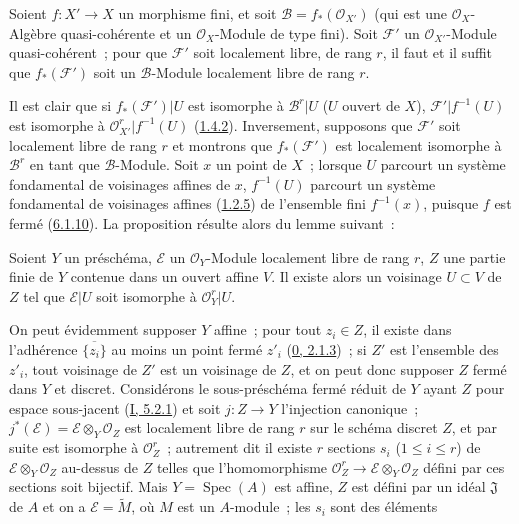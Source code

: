 \begin{proposition}[6.1.12]
\label{II.6.1.12-fr}
Soient $f:X'\to X$ un morphisme fini, et soit
$\mathcal{B}=f_*(\mathcal{O}_{X'})$ (qui est une $\mathcal{O}_X$-Algèbre
quasi-cohérente et un $\mathcal{O}_X$-Module de type fini). Soit
$\mathcal{F}'$ un $\mathcal{O}_{X'}$-Module quasi-cohérent~; pour que
$\mathcal{F}'$ soit localement libre, de rang $r$, il faut et il suffit que
$f_*(\mathcal{F}')$ soit un $\mathcal{B}$-Module localement libre de rang
$r$.
\end{proposition}

Il est clair que si $f_*(\mathcal{F}')|U$ est isomorphe à
$\mathcal{B}^r|U$ ($U$ ouvert de $X$), $\mathcal{F}'|f^{-1}(U)$ est isomorphe
à $\mathcal{O}_{X'}^r|f^{-1}(U)$
(\hyperref[II.1.4.2-fr]{1.4.2}). Inversement, supposons que $\mathcal{F}'$
soit localement libre de rang $r$ et montrons que $f_*(\mathcal{F}')$ est
localement isomorphe à $\mathcal{B}^r$ en tant que $\mathcal{B}$-Module. Soit
$x$ un point de $X$~; lorsque $U$ parcourt un système fondamental de
voisinages affines de $x$, $f^{-1}(U)$ parcourt un système fondamental de
voisinages affines (\hyperref[II.1.2.5-fr]{1.2.5}) de l'ensemble fini
$f^{-1}(x)$, puisque $f$ est fermé
(\hyperref[II.6.1.10-fr]{6.1.10}). La proposition résulte alors du lemme
suivant~:

\begin{lemma}[6.1.12.1]
\label{II.6.1.12.1-fr}
Soient $Y$ un préschéma, $\mathcal{E}$ un $\mathcal{O}_Y$-Module localement
libre de rang $r$, $Z$ une partie finie de $Y$ contenue dans un ouvert affine
$V$. Il existe alors un voisinage $U\subset V$ de $Z$ tel que
$\mathcal{E}|U$ soit isomorphe à $\mathcal{O}_Y^r|U$.
\end{lemma}

On peut évidemment supposer $Y$ affine~; pour tout $z_i\in Z$, il existe dans
l'adhérence $\overline{\{z_i\}}$ au moins un point fermé $z'_i$
(\hyperref[0.2.1.3-fr]{0, 2.1.3})~; si $Z'$ est l'ensemble des $z'_i$, tout
voisinage de $Z'$ est un voisinage de $Z$, et on peut donc supposer $Z$ fermé
dans $Y$ et discret. Considérons le sous-préschéma fermé réduit de $Y$ ayant
$Z$ pour espace sous-jacent (\hyperref[I.5.2.1-fr]{I, 5.2.1}) et soit
$j:Z\to Y$ l'injection canonique~; $j^*(\mathcal{E})=\mathcal{E}\otimes_Y
\mathcal{O}_Z$ est localement libre de rang $r$ sur le schéma discret $Z$,
et par suite est isomorphe à $\mathcal{O}_Z^r$~; autrement dit il existe $r$
sections $s_i$ ($1\leq i\leq r$) de $\mathcal{E}\otimes_Y\mathcal{O}_Z$
au-dessus de $Z$ telles que l'homomorphisme
$\mathcal{O}_Z^r\to\mathcal{E}\otimes_Y\mathcal{O}_Z$ défini par ces sections
soit bijectif. Mais $Y=\operatorname{Spec}(A)$ est affine, $Z$ est défini par
un idéal $\mathfrak{J}$ de $A$ et on a $\mathcal{E}=\widetilde{M}$, où $M$
est un $A$-module~; les $s_i$ sont des éléments

